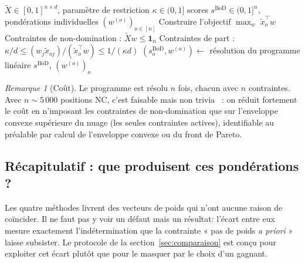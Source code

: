 \documentclass[11pt,a4paper]{article}
\theoremstyle{definition}
\theoremstyle{remark}
\newtheorem{remarque}{Remarque}[section]
\begin{document}
\bigskip

\begin{algorithm}[htbp]
\caption{Score \emph{benefit of the doubt} avec restrictions de poids}
\label{algo:bod}
\begin{algorithmic}[1]
\Require $\tilde{X}\in[0,1]^{n\times d}$, paramètre de restriction $\kappa \in (0,1]$
\Ensure scores $s^{\mathrm{BoD}} \in (0,1]^n$, pondérations individuelles $(w^{(o)})_{o\in[n]}$
  \State Construire l'objectif $\max_w \; \tilde{x}_o^\top w$
  \State Contraintes de non-domination : $\tilde{X} w \le \mathbf{1}_n$
  \State Contraintes de part : $\kappa/d \le (w_j \tilde{x}_{oj})/(\tilde{x}_o^\top w) \le 1/(\kappa d)$
  \State $(s^{\mathrm{BoD}}_o, w^{(o)}) \gets$ résolution du programme linéaire
\EndFor
\State \Return $s^{\mathrm{BoD}}$, $(w^{(o)})_o$
\end{algorithmic}
\end{algorithm}

\bigskip

\begin{remarque}[Coût]
  Le programme est résolu $n$ fois, chacun avec $n$ contraintes. Avec $n \sim 5\,000$ positions NC,
  c'est faisable mais non trivia ~: on réduit fortement le coût en n'imposant les contraintes de
  non-domination que sur l'enveloppe convexe supérieure du nuage (les seules contraintes actives),
  identifiable au préalable par calcul de l'enveloppe convexe ou du front de Pareto.
\end{remarque}

\bigskip

\subsection{Récapitulatif : que produisent ces pondérations ?}

\medskip

Les quatre méthodes livrent des vecteurs de poids qui n'ont aucune raison de coïncider. Il ne
faut pas y voir un défaut mais un résultat: l'écart entre eux mesure exactement l'indétermination
que la contrainte « pas de poids \emph{a priori} » laisse subsister. Le protocole de la
section~\ref{sec:comparaison} est conçu pour exploiter cet écart plutôt que pour le masquer par le
choix d'un gagnant.

\bigskip
\end{document}

